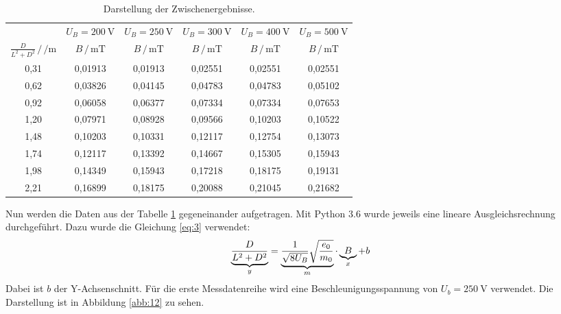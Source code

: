 \begin{table}[H]
  \centering
  \caption{Darstellung der Zwischenergebnisse.}
  \label{tab:5}
  \begin{tabular}{c c c c c c}
\toprule
& \multicolumn{1}{c}{$U_B=\SI{200}{\volt}$} & \multicolumn{1}{c}{$U_B=\SI{250}{\volt}$} &\multicolumn{1}{c}{$U_B=\SI{300}{\volt}$}&\multicolumn{1}{c}{$U_B=\SI{400}{\volt}$}&\multicolumn{1}{c}{$U_B=\SI{500}{\volt}$}\\
\cmidrule(lr){2-2}\cmidrule(lr){3-3}\cmidrule(lr){4-4}\cmidrule(lr){5-5}\cmidrule(lr){6-6}
$\frac{D}{L^2+D^2} \, /\, \si{\per\meter}$ & $B \,/\, \si{\milli\tesla}$ & $B \,/\, \si{\milli\tesla}$ &$B \,/\, \si{\milli\tesla}$ &$B \,/\, \si{\milli\tesla}$ &$B \,/\, \si{\milli\tesla}$\\
\midrule
0,31 & 0,01913 & 0,01913 & 0,02551 & 0,02551 & 0,02551\\
0,62 & 0,03826 & 0,04145 & 0,04783 & 0,04783 & 0,05102\\
0,92 & 0,06058 & 0,06377 & 0,07334 & 0,07334 & 0,07653\\
1,20 & 0,07971 & 0,08928 & 0,09566 & 0,10203 & 0,10522\\
1,48 & 0,10203 & 0,10331 & 0,12117 & 0,12754 & 0,13073\\
1,74 & 0,12117 & 0,13392 & 0,14667 & 0,15305 & 0,15943\\
1,98 & 0,14349 & 0,15943 & 0,17218 & 0,18175 & 0,19131\\
2,21 & 0,16899 & 0,18175 & 0,20088 & 0,21045 & 0,21682\\
\bottomrule
  \end{tabular}
\end{table}
Nun werden die Daten aus der Tabelle \ref{tab:5} gegeneinander aufgetragen.
Mit Python 3.6 wurde jeweils eine lineare Ausgleichsrechnung durchgeführt.
Dazu wurde die Gleichung \ref{eq:3} verwendet:
\begin{equation*}
  \underbrace{\frac{D}{L^2+D^2}}_{\mathclap{y}} = \underbrace{\frac{1}{\sqrt{8U_B}} \sqrt{\frac{e_0}{m_0}}}_{\mathclap{m}} \cdot \underbrace{B}_{\mathclap{x}} + b
\end{equation*}
Dabei ist $b$ der Y-Achsenschnitt.
Für die erste Messdatenreihe wird eine Beschleunigungsspannung von $U_b=\SI{250}{\volt}$ verwendet.
Die Darstellung ist in Abbildung \ref{abb:12} zu sehen.

